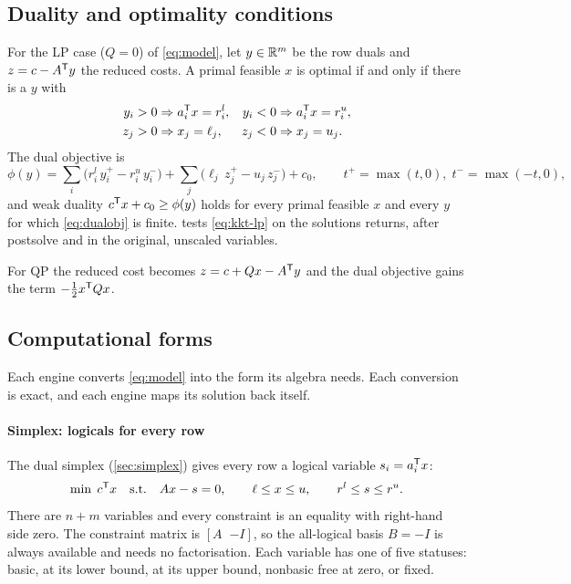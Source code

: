 \subsection{Duality and optimality conditions}
For the LP case ($Q=0$) of \eqref{eq:model}, let $y\in\mathbb{R}^m$ be the row duals and
$z = c - A^{\mathsf{T}} y$ the reduced costs. A primal feasible $x$ is optimal if and only if there is a $y$
with
\begin{equation}\label{eq:kkt-lp}
\begin{aligned}
  y_i > 0 &\Rightarrow a_i^{\mathsf{T}} x = r^l_i, & y_i < 0 &\Rightarrow a_i^{\mathsf{T}} x = r^u_i,\\
  z_j > 0 &\Rightarrow x_j = \ell_j,    & z_j < 0 &\Rightarrow x_j = u_j .
\end{aligned}
\end{equation}
The dual objective is
\begin{equation}\label{eq:dualobj}
  \phi(y) = \sum_i \bigl( r^l_i\, y_i^+ - r^u_i\, y_i^- \bigr)
          + \sum_j \bigl( \ell_j\, z_j^+ - u_j\, z_j^- \bigr) + c_0,
  \qquad t^+=\max(t,0),\; t^-=\max(-t,0),
\end{equation}
and weak duality $c^{\mathsf{T}} x + c_0 \ge \phi(y)$ holds for every primal feasible $x$ and every $y$ for
which \eqref{eq:dualobj} is finite.  tests \eqref{eq:kkt-lp} on the
solutions \nirnay{} returns, after postsolve and in the original, unscaled variables.

For QP the reduced cost becomes $z = c + Qx - A^{\mathsf{T}} y$ and the dual objective gains the term
$-\tfrac12 x^{\mathsf{T}} Q x$.

\subsection{Computational forms}
Each engine converts \eqref{eq:model} into the form its algebra needs. Each conversion is exact,
and each engine maps its solution back itself.

\paragraph{Simplex: logicals for every row}
The dual simplex (\cref{sec:simplex}) gives every row a logical variable $s_i = a_i^{\mathsf{T}} x$:
\begin{equation}\label{eq:simplex-form}
  \min\; c^{\mathsf{T}} x \quad \text{s.t.}\quad A x - s = 0,\qquad \ell\le x\le u,\qquad r^l\le s\le r^u .
\end{equation}
There are $n+m$ variables and every constraint is an equality with right-hand side zero. The
constraint matrix is $[A\;\; {-I}]$, so the all-logical basis $B=-I$ is always available and
needs no factorisation. Each variable has one of five statuses: basic, at its lower bound, at its
upper bound, nonbasic free at zero, or fixed.


